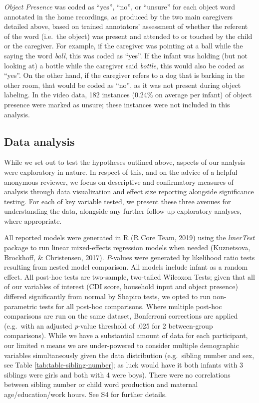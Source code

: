 \documentclass[
  man,mask,floatsintext]{apa6}
\begin{document}
\emph{Object Presence} was coded as ``yes'', ``no'', or ``unsure'' for each object word annotated in the home recordings, as produced by the two main caregivers detailed above, based on trained annotators' assessment of whether the referent of the word (i.e.~the object) was present and attended to or touched by the child or the caregiver. For example, if the caregiver was pointing at a ball while the saying the word \emph{ball}, this was coded as ``yes''. If the infant was holding (but not looking at) a bottle while the caregiver said \emph{bottle}, this would also be coded as ``yes''. On the other hand, if the caregiver refers to a dog that is barking in the other room, that would be coded as ``no'', as it was not present during object labeling. In the video data, 182 instances (0.24\% on average per infant) of object presence were marked as unsure; these instances were not included in this analysis.

\hypertarget{data-analysis}{%
\subsection{Data analysis}\label{data-analysis}}

While we set out to test the hypotheses outlined above, aspects of our analysis were exploratory in nature. In respect of this, and on the advice of a helpful anonymous reviewer, we focus on descriptive and confirmatory measures of analysis through data visualization and effect size reporting alongside significance testing. For each of key variable tested, we present these three avenues for understanding the data, alongside any further follow-up exploratory analyses, where appropriate.

All reported models were generated in R (R Core Team, 2019) using the \emph{lmerTest} package to run linear mixed-effects regression models when needed (Kuznetsova, Brockhoff, \& Christensen, 2017). \emph{P}-values were generated by likelihood ratio tests resulting from nested model comparison. All models include infant as a random effect. All post-hoc tests are two-sample, two-tailed Wilcoxon Tests; given that all of our variables of interest (CDI score, household input and object presence) differed significantly from normal by Shapiro tests, we opted to run non-parametric tests for all post-hoc comparisons. Where multiple post-hoc comparisons are run on the same dataset, Bonferroni corrections are applied (e.g.~with an adjusted \emph{p}-value threshold of .025 for 2 between-group comparisons). While we have a substantial amount of data for each participant, our limited \emph{n} means we are under-powered to consider multiple demographic variables simultaneously given the data distribution (e.g.~sibling number and sex, see Table \ref{tab:table-sibling-number}; as luck would have it both infants with 3 siblings were girls and both with 4 were boys). There were no correlations between sibling number or child word production and maternal age/education/work hours. See S4 for further details.
\end{document}

